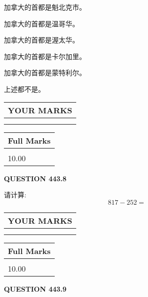 \documentclass{ctexart}
\begin{document}
  
 
 
加拿大的首都是魁北克市。
 
 
加拿大的首都是温哥华。
 
 
加拿大的首都是渥太华。
 
 
加拿大的首都是卡尔加里。
 
 
加拿大的首都是蒙特利尔。
 
 
 上述都不是。
 
 
  
\vspace{0.2in}
  
\noindent\begin{tabular}{|l|}
\hline
 YOUR MARKS  \\
\hline
 \\ 
 \\ 
\hline
\end{tabular}
\hspace{0.05in} \begin{tabular}{|l|}
\hline
 Full Marks  \\
\hline
 \\ 
10.00 \\
\hline
\end{tabular}
{\textbf{\Large{QUESTION
443.8 
}}}
  
  
 
请计算:
\begin{equation}
817 -   %
252 = \nonumber
\end{equation}
 

 

 
  
\vspace{0.2in}
  
\noindent\begin{tabular}{|l|}
\hline
 YOUR MARKS  \\
\hline
 \\ 
 \\ 
\hline
\end{tabular}
\hspace{0.05in} \begin{tabular}{|l|}
\hline
 Full Marks  \\
\hline
 \\ 
10.00 \\
\hline
\end{tabular}
{\textbf{\Large{QUESTION
443.9 
}}}
  
\end{document}
